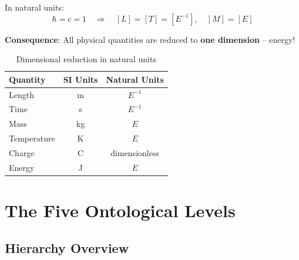 	In natural units:
	\begin{equation}
		\hbar = c = 1 \quad \Rightarrow \quad [L] = [T] = [E^{-1}], \quad [M] = [E]
	\end{equation}
	
	\textbf{Consequence}: All physical quantities are reduced to \textbf{one dimension} -- energy!
	
	\begin{table}[H]
		\centering
		\begin{tabular}{lcc}
			\toprule
			\textbf{Quantity} & \textbf{SI Units} & \textbf{Natural Units} \\
			\midrule
			Length & m & $E^{-1}$ \\
			Time & s & $E^{-1}$ \\
			Mass & kg & $E$ \\
			Temperature & K & $E$ \\
			Charge & C & dimensionless \\
			Energy & J & $E$ \\
			\bottomrule
		\end{tabular}
		\caption{Dimensional reduction in natural units}
	\end{table}
	
	\section{The Five Ontological Levels}
	
	\subsection{Hierarchy Overview}
	
